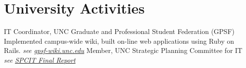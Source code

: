 \section{University Activities}
		{IT Coordinator, UNC Graduate and Professional Student Federation (GPSF)\newline
			\small
			Implemented campus-wide wiki, built on-line web applications using Ruby on Rails.
			\hfill{\itshape\color{see}\footnotesize{}see
			\href{http://gpsf-wiki.unc.edu}{gpsf-wiki.unc.edu}}
		}
		{Member, UNC Strategic Planning Committee for IT
			\hfill{\itshape\color{see}\footnotesize{}see
			\href{http://its.unc.edu/ccm/groups/assets/documents/content/doc_its_2007_strategic_plan.pdf}{SPCIT Final Report}}
		}

